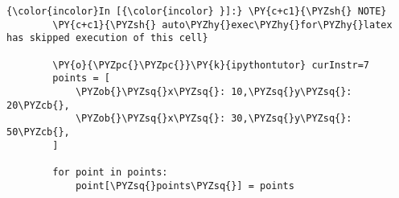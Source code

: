     \begin{Verbatim}[commandchars=\\\{\},frame=single,framerule=0.3mm,rulecolor=\color{cellframecolor}]
{\color{incolor}In [{\color{incolor} }]:} \PY{c+c1}{\PYZsh{} NOTE}
        \PY{c+c1}{\PYZsh{} auto\PYZhy{}exec\PYZhy{}for\PYZhy{}latex has skipped execution of this cell}
        
        \PY{o}{\PYZpc{}\PYZpc{}}\PY{k}{ipythontutor} curInstr=7
        points = [
            \PYZob{}\PYZsq{}x\PYZsq{}: 10,\PYZsq{}y\PYZsq{}: 20\PYZcb{},
            \PYZob{}\PYZsq{}x\PYZsq{}: 30,\PYZsq{}y\PYZsq{}: 50\PYZcb{},
        ]
        
        for point in points:
            point[\PYZsq{}points\PYZsq{}] = points
\end{Verbatim}



    
    
    
